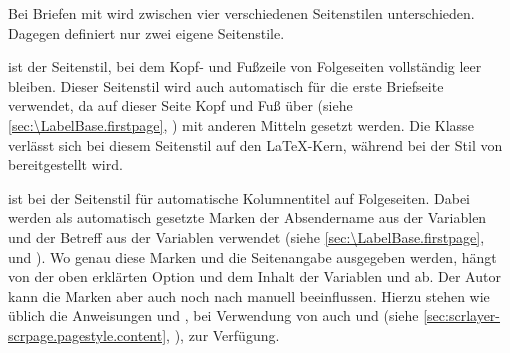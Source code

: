 \begin{Declaration}
\end{Declaration}%
%
%
%
%
Bei Briefen mit  wird zwischen vier
verschiedenen Seitenstilen unterschieden. Dagegen definiert
 nur zwei eigene Seitenstile.
\begin{description}
\item[{\PageStyle{empty}}] %
  ist der Seitenstil, bei dem Kopf- und Fußzeile von Folgeseiten vollständig
  leer bleiben. Dieser Seitenstil wird auch automatisch für die erste
  Briefseite verwendet, da auf dieser Seite Kopf und Fuß über
   (siehe
  \autoref{sec:\LabelBase.firstpage}, )
  mit anderen Mitteln gesetzt werden. Die Klasse  verlässt
  sich bei diesem Seitenstil auf den \LaTeX-Kern, während bei
   der Stil von \hyperref[cha:scrlayer]{}
  bereitgestellt wird.
\item[{\PageStyle{headings}}] %
  ist bei  der Seitenstil für
  automatische Kolumnentitel auf Folgeseiten. Dabei werden als automatisch
  gesetzte Marken der Absendername aus der Variablen
   und der
  Betreff aus der Variablen
   verwendet
  (siehe \autoref{sec:\LabelBase.firstpage},
   und
  ). Wo genau diese Marken und die
  Seitenangabe ausgegeben werden, hängt von der oben erklärten Option
   und dem Inhalt der Variablen
   und
   ab. Der Autor kann die
  Marken aber auch noch nach  manuell
  beeinflussen. Hierzu stehen wie üblich die Anweisungen
   und ,
  bei Verwendung von
  \hyperref[cha:scrlayer-scrpage]{}%
   auch
   und
   (siehe
  \autoref{sec:scrlayer-scrpage.pagestyle.content},
  ), zur Verfügung.


\end{description}
